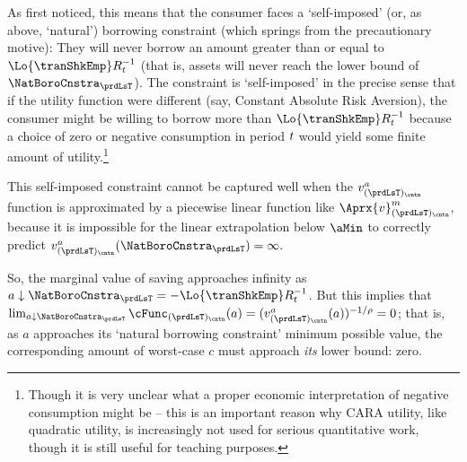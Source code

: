 \documentclass[SolvingMicroDSOPs]{subfiles}
\begin{document}
As \cite{zeldesStochastic} first noticed, this means that the consumer faces a `self-imposed' (or, as above, `natural') borrowing constraint (which springs from the precautionary motive): They will never borrow an amount greater than or equal to $\Lo{\tranShkEmp}\RNrm_{\prdT}^{-1}$ (that is, assets will never reach the lower bound of $\NatBoroCnstra_{\prdLsT}$).  The constraint is `self-imposed' in the precise sense that if the utility function were different (say, Constant Absolute Risk Aversion), the consumer might be willing to borrow more than $\Lo{\tranShkEmp}\RNrm_{\prdT}^{-1}$ because a choice of zero or negative consumption in period $t$ would yield some finite amount of utility.\footnote{Though it is very unclear what a proper economic interpretation of negative consumption might be -- this is an important reason why CARA utility, like quadratic utility, is increasingly not used for serious quantitative work, though it is still useful for teaching purposes.}

This self-imposed constraint cannot be captured well when the $\vFunc^{a}_{(\prdLsT)_\cntn}$ function is approximated by a piecewise linear function like $\Aprx{\vFunc}^{m}_{(\prdLsT)_\cntn}$, because it is impossible for the linear extrapolation below $\aMin$ to correctly predict $\vFunc^{a}_{(\prdLsT)_\cntn}(\NatBoroCnstra_{\prdLsT})=\infty.$ %


So, the marginal value of saving approaches infinity as $\aNrm \downarrow \NatBoroCnstra_{\prdLsT}=-\Lo{\tranShkEmp}\RNrm_{\prdT}^{-1}$.  But this implies that $\lim_{\aNrm \downarrow \NatBoroCnstra_{\prdLsT}} \cFunc_{(\prdLsT)_\cntn}(\aNrm) = (\vFunc^{a}_{(\prdLsT)_\cntn}(\aNrm))^{-1/\CRRA} = 0$; that is, as $a$ approaches its `natural borrowing constraint' minimum possible value, the corresponding amount of worst-case $c$ must approach \textit{its} lower bound: zero.
\end{document}
